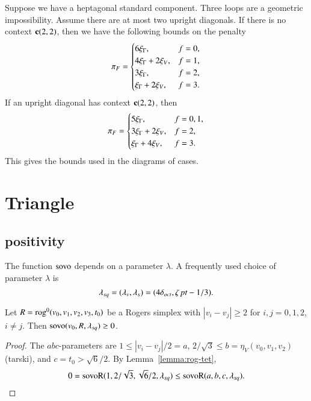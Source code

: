 Suppose we have a heptagonal standard component.  Three loops are a
geometric impossibility. Assume there are at most two upright
diagonals.
 If there is no context ${\operatorname{\bf c}}{(2,2)}$,
 then we have the following bounds on the penalty
    $$
    {\pi_F} = \begin{cases} 6\xi_\Gamma, & f=0,\\
                 4\xi_\Gamma+2\xi_V, & f=1,\\
                3\xi_\Gamma, & f=2,\\
                \xi_\Gamma+2\xi_V, & f=3.
            \end{cases}
    $$
If an upright diagonal has context ${\operatorname{\bf c}}{(2,2)}$, then
    $$
    {\pi_F} = \begin{cases} 5\xi_\Gamma, & f=0,1,\\
                3\xi_\Gamma + 2\xi_V, & f=2,\\
                \xi_\Gamma + 4 \xi_V, &f = 3.\\
            \end{cases}
    $$
This gives the bounds used in the diagrams of cases.








\section{Triangle}


\subsection{positivity}%
    \label{sec:pos}

The function ${\operatorname{sovo}}$ depends on a parameter $\lambda$.
A frequently used choice of parameter $\lambda$ is
$$
 \lambda_{sq} =(\lambda_v,\lambda_s)=(4\delta_{oct},\zeta\,\hbox{\it pt}-1/3).
$$


\begin{lemma}\label{lemma:rog-squ0}
Let $R={\operatorname{rog}}^0(v_0,v_1,v_2,v_3,t_0)$ be a Rogers simplex
with $|v_i-v_j|\ge 2$ for $i,j=0,1,2$, $i\ne j$.
Then ${\operatorname{sovo}}(v_0,R,\lambda_{sq})\ge 0$.
\end{lemma}

\begin{proof}
The $abc$-parameters are $1 \le |v_i-v_j|/2 = a$,
$2/\sqrt{3}\le b = \eta_V(v_0,v_1,v_2)$ (tarski),
and $c = t_0 > \sqrt6/2$.  By Lemma~\ref{lemma:rog-tet},
$$
0 = {\operatorname{sovoR}}(1,2/\sqrt{3},\sqrt{6}/2,\lambda_{sq}) 
   \le {\operatorname{sovoR}}(a,b,c,\lambda_{sq}).
$$
\end{proof}



